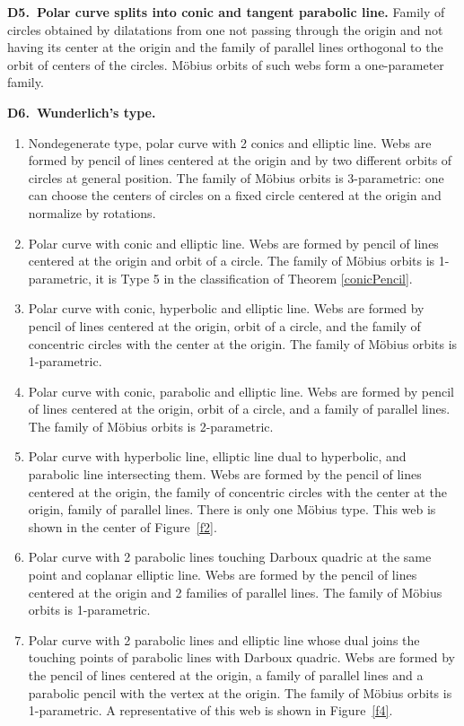 \documentclass[pdftex]{sigma}
\numberwithin{equation}{section}
\begin{document}
 {\bf D5.\ Polar curve splits into conic and tangent parabolic line.}
 Family of circles obtained by dilatations from one not passing through the origin and not having its center at the origin and the family of parallel lines orthogonal to the orbit of centers of the circles. M\"obius orbits of such webs form a one-parameter family.


 {\bf D6.\ Wunderlich's type.}
\begin{enumerate}\itemsep=0pt
\item[(1)] Nondegenerate type, polar curve with 2 conics and elliptic line. Webs are formed by pencil of lines centered at the origin and by two different orbits of circles at general position. The family of M\"obius orbits is 3-parametric: one can choose the centers of circles on a fixed circle centered at the origin and normalize by rotations.

\item[(2)] Polar curve with conic and elliptic line. Webs are formed by pencil of lines centered at the origin and orbit of a circle. The family of M\"obius orbits is 1-parametric, it is Type 5 in the classification of Theorem \ref{conicPencil}.

\item[(3)] Polar curve with conic, hyperbolic and elliptic line. Webs are formed by pencil of lines centered at the origin, orbit of a circle, and the family of concentric circles with the center at the origin. The family of M\"obius orbits is 1-parametric.

\item[(4)] Polar curve with conic, parabolic and elliptic line. Webs are formed by pencil of lines centered at the origin, orbit of a circle, and a family of parallel lines. The family of M\"obius orbits is 2-parametric.

\item[(5)] Polar curve with hyperbolic line, elliptic line dual to hyperbolic, and parabolic line intersecting them. Webs are formed by the pencil of lines centered at the origin, the family of concentric circles with the center at the origin, family of parallel lines. There is only one M\"obius type. This web is shown in the center of Figure~\ref{f2}.

\item[(6)] Polar curve with 2 parabolic lines touching Darboux quadric at the same point and coplanar elliptic line. Webs are formed by the pencil of lines centered at the origin and 2 families of parallel lines. The family of M\"obius orbits is 1-parametric.

\item[(7)] Polar curve with 2 parabolic lines and elliptic line whose dual joins the touching points of parabolic lines with Darboux quadric. Webs are formed by the pencil of lines centered at the origin, a family of parallel lines and a parabolic pencil with the vertex at the origin. The family of M\"obius orbits is 1-parametric. A representative of this web is shown in Figure~\ref{f4}.

\end{enumerate}
\end{document}
